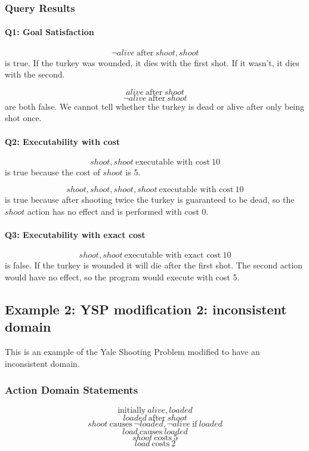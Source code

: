 \documentclass[11pt]{article}
\begin{document}
\subsubsection*{Query Results}
\paragraph{Q1: Goal Satisfaction}
\[\neg alive ~\text{after}~ shoot, shoot\]
is true. If the turkey was wounded, it dies with the first shot. If it wasn't, it dies with the second.

\[alive ~\text{after}~ shoot\]
\[\neg alive ~\text{after}~ shoot\]
are both false. We cannot tell whether the turkey is dead or alive after only being shot once.

\paragraph{Q2: Executability with cost}
\[shoot, shoot ~\text{executable with cost}~ 10\]
is true because the cost of \(shoot\) is 5.

\[shoot, shoot, shoot, shoot ~\text{executable with cost}~ 10\]
is true because after shooting twice the turkey is guaranteed to be dead, so the \(shoot\) action
has no effect and is performed with cost 0.

\paragraph{Q3: Executability with exact cost}
\[shoot, shoot ~\text{executable with exact cost}~ 10\]
is false. If the turkey is wounded it will die after the first shot. The second action would have
no effect, so the program would execute with cost 5.

\subsection*{Example 2: YSP modification 2: inconsistent domain}
This is an example of the Yale Shooting Problem modified to have an inconsistent domain.

\subsubsection*{Action Domain Statements}
\[\text{initially}~ alive, loaded\]
\[loaded ~\text{after}~ shoot\]
\[shoot ~\text{causes}~ \neg loaded, \neg alive ~\text{if}~ loaded\]
\[load ~\text{causes}~ loaded\]
\[shoot ~\text{costs}~ 5\]
\[load ~\text{costs}~ 2\]
\end{document}
